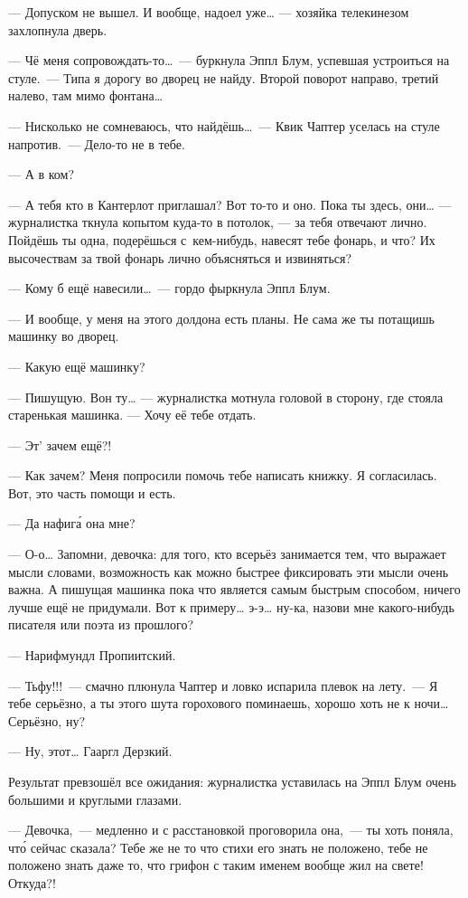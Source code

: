 \documentclass[fontsize=11pt,a5paper,titlepage=firstcover]{scrbook}
\begin{document}
--- Допуском не вышел. И вообще, надоел уже{\ldots} --- хозяйка телекинезом захлопнула дверь.

--- Чё меня сопровождать-то{\ldots}~--- буркнула Эппл Блум, успевшая устроиться на стуле.~--- Типа я дорогу во дворец не найду. Второй поворот направо, третий налево, там мимо фонтана{\ldots}

--- Нисколько не сомневаюсь, что найдёшь{\ldots}~--- Квик Чаптер уселась на стуле напротив.~--- Дело-то не в тебе.

--- А в ком?

--- А тебя кто в Кантерлот приглашал? Вот то-то и оно. Пока ты здесь, они{\ldots} --- журналистка ткнула копытом куда-то в потолок, --- за тебя отвечают лично. Пойдёшь ты одна, подерёшься с~кем-нибудь, навесят тебе фонарь, и что? Их высочествам за твой фонарь лично объясняться и извиняться?

--- Кому б ещё навесили{\ldots}~--- гордо фыркнула Эппл Блум.

--- И вообще, у меня на этого долдона есть планы. Не сама же ты потащишь машинку во дворец.

--- Какую ещё машинку?

--- Пишущую. Вон ту{\ldots} --- журналистка мотнула головой в сторону, где стояла старенькая машинка. --- Хочу её тебе отдать.

--- Эт’ зачем ещё?!

--- Как зачем? Меня попросили помочь тебе написать книжку. Я согласилась. Вот, это часть помощи и есть.

--- Да нафига́ она мне?

--- О-о{\ldots} Запомни, девочка: для того, кто всерьёз занимается тем, что выражает мысли словами, возможность как можно быстрее фиксировать эти мысли очень важна. А пишущая машинка пока что является самым быстрым способом, ничего лучше ещё не придумали. Вот к примеру{\ldots} э-э{\ldots} ну-ка, назови мне какого-нибудь писателя или поэта из прошлого?

--- Нарифмундл Пропиитский.

--- Тьфу!!!~--- смачно плюнула Чаптер и ловко испарила плевок на лету.~--- Я тебе серьёзно, а ты этого шута горохового поминаешь, хорошо хоть не к ночи{\ldots} Серьёзно, ну?

--- Ну, этот{\ldots} Гааргл Дерзкий.

Результат превзошёл все ожидания: журналистка уставилась на Эппл Блум очень большими и круглыми глазами.

--- Девочка,~--- медленно и с расстановкой проговорила она,~--- ты хоть поняла, что́ сейчас сказала? Тебе же не то что стихи его знать не положено, тебе не положено знать даже то, что грифон с таким именем вообще жил на свете! Откуда?!
\end{document}
